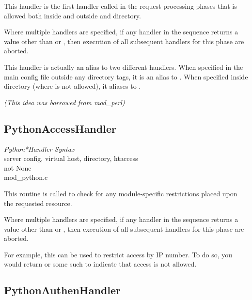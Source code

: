 This handler is the first handler called in the request processing
phases that is allowed both inside and outside  and
directory.

Where multiple handlers are specified, if any handler in the sequence
returns a value other than  or , then
execution of all subsequent handlers for this phase are aborted.

This handler is actually an alias to two different handlers. When
specified in the main config file outside any directory tags, it is an
alias to . When specified inside directory
(where  is not allowed), it aliases to
.

\emph{(This idea was borrowed from mod_perl)}

\subsection{PythonAccessHandler\label{dir-handlers-ach}}

\emph{Python*Handler Syntax}\\
server config, virtual host, directory, htaccess\\
not None\\
mod_python.c

This routine is called to check for any module-specific restrictions
placed upon the requested resource.

Where multiple handlers are specified, if any handler in the sequence
returns a value other than  or , then
execution of all subsequent handlers for this phase are aborted.

For example, this can be used to restrict access by IP number. To do
so, you would return  or some such to indicate
that access is not allowed.

\subsection{PythonAuthenHandler\label{dir-handlers-auh}}

